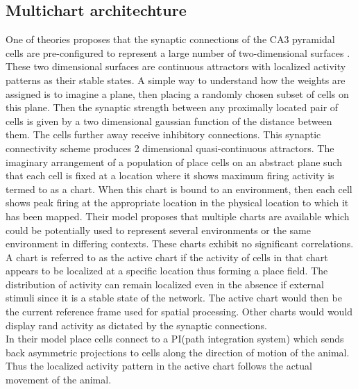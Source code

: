 \subsection{Multichart architechture}
\label{pathIntegration}
One of theories proposes that the synaptic connections of the CA3 pyramidal cells are pre-configured to represent a large number of two-dimensional surfaces \cite{Samsonovich1997}. These two dimensional surfaces are continuous attractors with localized activity patterns as their stable states. A simple way to understand how the weights are assigned is to imagine a plane, then placing a randomly chosen subset of cells on this plane. Then the synaptic strength between any proximally located pair of cells is given by a two dimensional gaussian function of the distance between them. The cells further away receive inhibitory connections. This synaptic connectivity scheme produces 2 dimensional quasi-continuous attractors. The imaginary arrangement of a population of place cells on an abstract plane such that each  cell is fixed at a location where it shows maximum firing activity is termed to as a chart. When this chart is bound to an environment, then each cell shows peak firing at the appropriate location in the physical location to which it has been mapped. Their model proposes that multiple charts are available which could be potentially used to represent several environments or the same environment in differing contexts. These charts exhibit no significant correlations. A chart is referred to as the active chart if the activity of cells in that chart appears to be localized at a specific location thus forming a place field. The distribution of activity can remain localized even in the absence if external stimuli since it is a stable state of the network. The active chart would then be the current reference frame used for spatial processing. Other charts would would display rand activity as dictated by the synaptic connections. \\
In their model place cells connect to a PI(path integration system) which sends back asymmetric projections to cells along the direction of motion of the animal. Thus the localized activity pattern in the active chart follows the actual movement of the animal.

